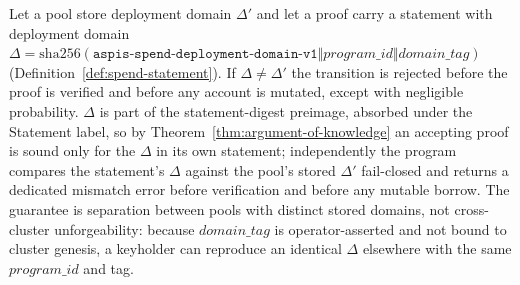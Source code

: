 \begin{lemma}
\label{lem:deployment-domain}
Let a pool store deployment domain \(\Delta'\) and let a proof carry a
statement with deployment domain \(\Delta=\mathrm{sha256}(
\mathtt{aspis\mbox{-}spend\mbox{-}deployment\mbox{-}domain\mbox{-}v1}
\Vert\mathit{program\_id}\Vert\mathit{domain\_tag})\)
(Definition~\ref{def:spend-statement}).  If \(\Delta\neq\Delta'\) the
transition is rejected before the proof is verified and before any account is
mutated, except with negligible probability.  \(\Delta\) is part of the
statement-digest preimage, absorbed under the \textsf{Statement} label, so by
Theorem~\ref{thm:argument-of-knowledge} an accepting proof is sound only for
the \(\Delta\) in its own statement; independently the program compares the
statement's \(\Delta\) against the pool's stored \(\Delta'\) fail-closed and
returns a dedicated mismatch error before verification and before any mutable
borrow.  The guarantee is separation between pools with distinct stored
domains, not cross-cluster unforgeability: because \(\mathit{domain\_tag}\) is
operator-asserted and not bound to cluster genesis, a keyholder can reproduce
an identical \(\Delta\) elsewhere with the same \(\mathit{program\_id}\) and
tag.
\end{lemma}
